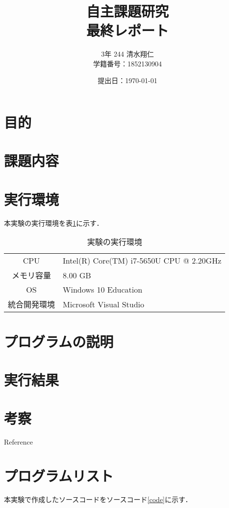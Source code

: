 \documentclass[a4j]{jarticle}
\title {自主課題研究\\最終レポート\\}
\author {3年 244 清水翔仁 \\学籍番号：1852130904}
\date{\西暦 提出日：\today}
\begin{document}
  \maketitle
  \thispagestyle{empty}
  \newpage
  \setcounter{page}{1}
  \pagestyle{plain}

\section{目的}

\section{課題内容}

\section{実行環境}
  本実験の実行環境を表\ref{tab_env}に示す．
  \begin{table}[htbp]
    \centering
    \caption{実験の実行環境}
    \label{tab_env}
      \begin{tabular}{c|l}
        \toprule
        CPU & Intel(R) Core(TM) i7-5650U CPU @ 2.20GHz \\
        メモリ容量 & 8.00 GB \\
        OS & Windows 10 Education \\
        統合開発環境 & Microsoft Visual Studio \\
        \bottomrule
      \end{tabular}
  \end{table}

\section{プログラムの説明}

\section{実行結果}\label{result}

\section{考察}

\begin{thebibliography}{9}
   Reference
\end{thebibliography}

\appendix
\def\thesection{付録\Alph{section}}\section{プログラムリスト}\label{appendix}
  本実験で作成したソースコードをソースコード\ref{code}に示す．

\begin{lstlisting}[label = code, caption = CaptionTitle]

\end{lstlisting}
\end{document}

